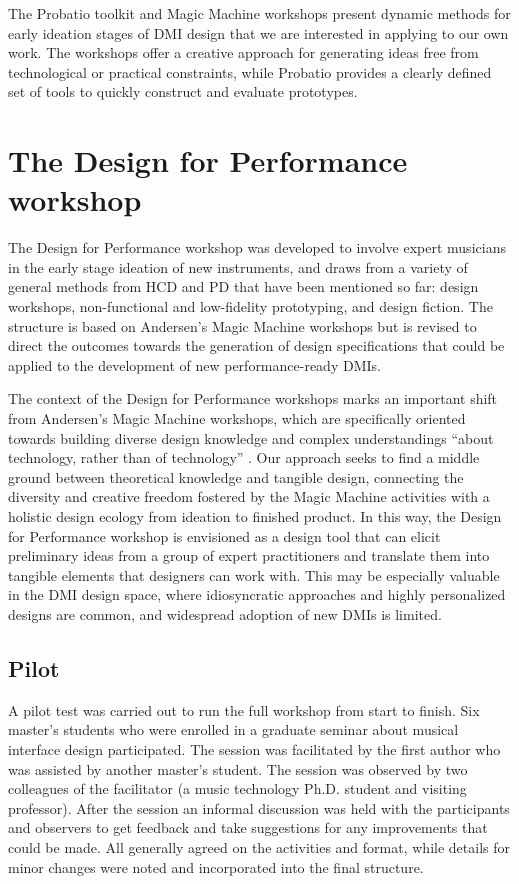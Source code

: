 \documentclass[letterpaper, 12pt]{article}
\begin{document}
The Probatio toolkit and Magic Machine workshops present dynamic methods for early ideation stages of DMI design that we are interested in applying to our own work. The workshops offer a creative approach for generating ideas free from technological or practical constraints, while Probatio provides a clearly defined set of tools to quickly construct and evaluate prototypes. 

\section{The Design for Performance workshop}
\label{sec:design-for-performance-workshop}

The Design for Performance workshop was developed to involve expert musicians in the early stage ideation of new instruments, and draws from a variety of general methods from HCD and PD that have been mentioned so far: design workshops, non-functional and low-fidelity prototyping, and design fiction. The structure is based on Andersen's Magic Machine workshops but is revised to direct the outcomes towards the generation of design specifications that could be applied to the development of new performance-ready DMIs. 

The context of the Design for Performance workshops marks an important shift from Andersen's Magic Machine workshops, which are specifically oriented towards building diverse design knowledge and complex understandings ``about technology, rather than of technology'' \citep[p. 1]{Andersen2019}. Our approach seeks to find a middle ground between theoretical knowledge and tangible design, connecting the diversity and creative freedom fostered by the Magic Machine activities with a holistic design ecology from ideation to finished product. In this way, the Design for Performance workshop is envisioned as a design tool that can elicit preliminary ideas from a group of expert practitioners and translate them into tangible elements that designers can work with. This may be especially valuable in the DMI design space, where idiosyncratic approaches and highly personalized designs are common, and widespread adoption of new DMIs is limited.

\subsection{Pilot}
\label{sec:pilot}

A pilot test was carried out to run the full workshop from start to finish. Six master's students who were enrolled in a graduate seminar about musical interface design participated. The session was facilitated by the first author who was assisted by another master's student. The session was observed by two colleagues of the facilitator (a music technology Ph.D. student and visiting professor). After the session an informal discussion was held with the participants and observers to get feedback and take suggestions for any improvements that could be made. All generally agreed on the activities and format, while details for minor changes were noted and incorporated into the final structure.  
\end{document}
